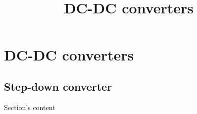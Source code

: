 \section{DC-DC converters}
\title{DC-DC converters}  

\begin{frame}[plain]
    \titlepage
\end{frame}

\subsection{Step-down converter}

\begin{frame}{Section's content}
\end{frame}


